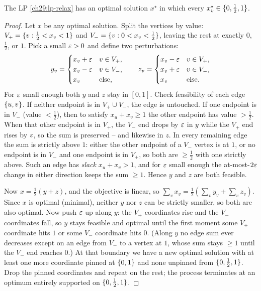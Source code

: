 \begin{theorem}
\label{ch29:thm-half}
The LP \eqref{ch29:lp-relax} has an optimal solution $x^\star$ in which every
$x^\star_v\in\{0,\tfrac12,1\}$.
\end{theorem}

\begin{proof}
Let $x$ be any optimal solution. Split the vertices by value:
$V_+=\{v:\tfrac12<x_v<1\}$ and $V_-=\{v:0<x_v<\tfrac12\}$, leaving the rest
at exactly $0$, $\tfrac12$, or $1$. Pick a small $\varepsilon>0$ and define two perturbations:
\[
  y_v=\begin{cases} x_v+\varepsilon & v\in V_+,\\ x_v-\varepsilon & v\in V_-,\\ x_v & \text{else,}\end{cases}
  \qquad
  z_v=\begin{cases} x_v-\varepsilon & v\in V_+,\\ x_v+\varepsilon & v\in V_-,\\ x_v & \text{else.}\end{cases}
\]
For $\varepsilon$ small enough both $y$ and $z$ stay in $[0,1]$. Check feasibility of
each edge $\{u,v\}$. If neither endpoint is in $V_+\cup V_-$, the edge is
untouched. If one endpoint is in $V_-$ (value $<\tfrac12$), then to satisfy
$x_u+x_v\ge1$ the other endpoint has value $>\tfrac12$. When that other endpoint
is in $V_+$, the $V_-$ end drops by $\varepsilon$ in $y$ while the $V_+$ end rises by
$\varepsilon$, so the sum is preserved -- and likewise in $z$. In every remaining edge
the sum is strictly above $1$: either the other endpoint of a $V_-$ vertex is at
$1$, or no endpoint is in $V_-$ and one endpoint is in $V_+$, so both are
$\ge\tfrac12$ with one strictly above. Such an edge has \emph{slack}
$x_u+x_v>1$, and for $\varepsilon$ small enough the at-most-$2\varepsilon$ change in either
direction keeps the sum $\ge1$. Hence $y$ and $z$ are both feasible.

Now $x=\tfrac12(y+z)$, and the objective is linear, so
$\sum_v x_v=\tfrac12(\sum_v y_v+\sum_v z_v)$. Since $x$ is optimal (minimal),
neither $y$ nor $z$ can be strictly smaller, so both are also optimal. Now push
$\varepsilon$ up along $y$: the $V_+$ coordinates rise and the $V_-$ coordinates fall, so
$y$ stays feasible and optimal until the first moment some $V_+$ coordinate hits
$1$ or some $V_-$ coordinate hits $0$. (Along $y$ no edge sum ever decreases
except on an edge from $V_-$ to a vertex at $1$, whose sum stays $\ge 1$ until
the $V_-$ end reaches $0$.) At that boundary we have a new optimal solution with at
least one more coordinate pinned at $\{0,1\}$ and none unpinned from
$\{0,\tfrac12,1\}$. Drop the pinned coordinates and repeat on the rest; the
process terminates at an optimum entirely supported on $\{0,\tfrac12,1\}$.
\end{proof}

